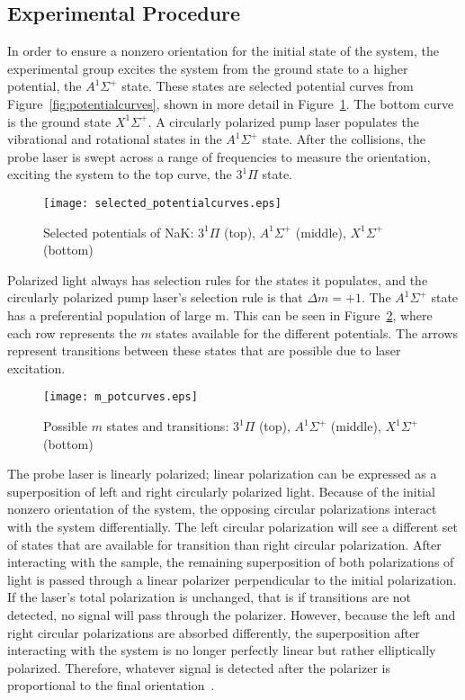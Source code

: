 \documentclass[letterpaper,11pt]{article}
\begin{document}
\subsection{Experimental Procedure}
In order to ensure a nonzero orientation for the initial state of the system,
the experimental group excites the system from the ground state to a higher
potential, the $A^1\Sigma^+$ state.  These states are selected potential curves
from Figure~\ref{fig:potentialcurves}, shown in more detail in
Figure~\ref{fig:selected_potcurves}.  The bottom curve is the ground state
$X^1\Sigma^+$.  A circularly polarized pump laser populates the vibrational and
rotational states in the $A^1\Sigma^+$ state.  After the collisions, the probe
laser is swept across a range of frequencies to measure the orientation,
exciting the system to the top curve, the $3^1\Pi$ state.
\begin{figure}[ht]
    \centering
    \texttt{[image: selected\_potentialcurves.eps]}
    \caption{Selected potentials of NaK\@: $3^1\Pi$ (top), $A^1\Sigma^+$ (middle), $X^1\Sigma^+$ (bottom)}
\label{fig:selected_potcurves}
\end{figure}

Polarized light always has selection rules for the states it populates, and the
circularly polarized pump laser's selection rule is that $\Delta m=+1$.  The
$A^1\Sigma^+$ state has a preferential population of large m.  This can be seen
in Figure~\ref{fig:m_potcurves}, where each row represents the $m$ states
available for the different potentials.  The arrows represent transitions
between these states that are possible due to laser excitation.
\begin{figure}[ht]
    \centering
    \texttt{[image: m\_potcurves.eps]}
    \caption{Possible $m$ states and transitions: $3^1\Pi$ (top), $A^1\Sigma^+$ (middle), $X^1\Sigma^+$ (bottom)}
\label{fig:m_potcurves}
\end{figure}

The probe laser is linearly polarized; linear polarization can be expressed as
a superposition of left and right circularly polarized light.  Because of the
initial nonzero orientation of the system, the opposing circular polarizations
interact with the system differentially.  The left circular polarization will
see a different set of states that are available for transition than right
circular polarization.  After interacting with the sample, the remaining
superposition of both polarizations of light is passed through a linear
polarizer perpendicular to the initial polarization.  If the laser's total
polarization is unchanged, that is if transitions are not detected, no signal
will pass through the polarizer.  However, because the left and right circular
polarizations are absorbed differently, the superposition after interacting
with the system is no longer perfectly linear but rather elliptically
polarized.  Therefore, whatever signal is detected after the polarizer is
proportional to the final orientation~\cite{Jon15}.
\end{document}
